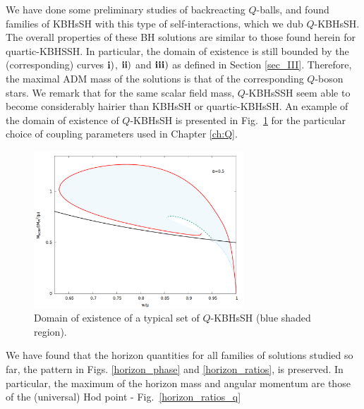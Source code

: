 We have done some preliminary studies of backreacting $Q$-balls, and found families of KBHsSH with this type of self-interactions, which we dub $Q$-KBHsSH. The overall properties of these BH solutions are similar to those found herein for  quartic-KBHSSH.
In particular, the domain of existence is still bounded by the (corresponding)
curves ${\bf i)}$, ${\bf ii)}$ and ${\bf iii)}$ as defined in Section \ref{sec_III}. 
Therefore, the maximal ADM mass 
of the solutions is 
that of the corresponding $Q$-boson stars.
We remark that for the same scalar field mass, $Q$-KBHsSSH seem able to become considerably hairier than KBHsSH or quartic-KBHsSH.
%
An example of the domain of existence of $Q$-KBHsSH is presented in Fig.~\ref{qkbhsh} for the particular choice of coupling parameters used in Chapter \ref{ch:Q}.
%
\begin{figure}[h!]
  \begin{center}
     \includegraphics[width=0.7\textwidth]{papers/selfInteractions/w-vs-M-Q-a=05.png}
      \end{center}
  \caption{Domain of existence of a typical set of $Q$-KBHsSH (blue shaded region).}
  \label{qkbhsh}
\end{figure}
%


We have found that the horizon quantities
for all families of solutions studied so far,
 the pattern in 
Figs. \ref{horizon_phase} and \ref{horizon_ratios},   
is preserved.
In particular, the maximum of the horizon mass and angular momentum
are those of the (universal) Hod point - Fig.~\ref{horizon_ratios_q}

